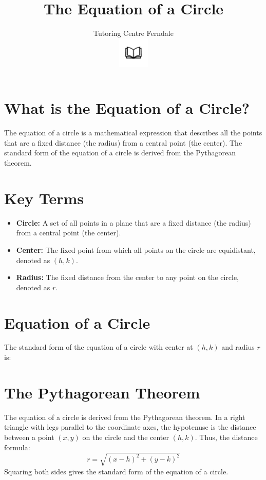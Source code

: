 \documentclass[12pt]{article}
\title{The Equation of a Circle}\\
\author{Tutoring Centre Ferndale\\
\includegraphics[width=4em]{ApS_logo.png}}
\date{}
\begin{document}
\maketitle

\section*{What is the Equation of a Circle?}

The equation of a circle is a mathematical expression that describes all the points that are a fixed distance (the radius) from a central point (the center). The standard form of the equation of a circle is derived from the Pythagorean theorem.

\section*{Key Terms}

\begin{itemize}
    \item \textbf{Circle:} A set of all points in a plane that are a fixed distance (the radius) from a central point (the center).
    \item \textbf{Center:} The fixed point from which all points on the circle are equidistant, denoted as \( (h, k) \).
    \item \textbf{Radius:} The fixed distance from the center to any point on the circle, denoted as \( r \).
\end{itemize}

\section*{Equation of a Circle}

The standard form of the equation of a circle with center at \( (h, k) \) and radius \( r \) is:
\boldmath{\[
(x - h)^2 + (y - k)^2 = r^2
\]}

\section*{The Pythagorean Theorem}

The equation of a circle is derived from the Pythagorean theorem. In a right triangle with legs parallel to the coordinate axes, the hypotenuse is the distance between a point \( (x, y) \) on the circle and the center \( (h, k) \). Thus, the distance formula:
\[
r = \sqrt{(x - h)^2 + (y - k)^2}
\]
Squaring both sides gives the standard form of the equation of a circle.
\end{document}

